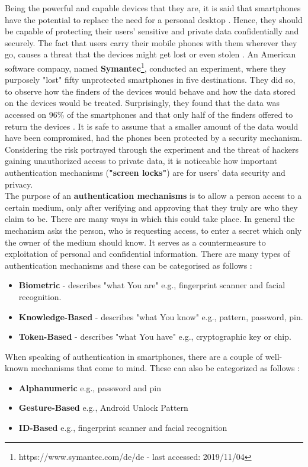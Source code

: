 Being the powerful and capable devices that they are, it is said that smartphones have the potential to replace the need for a personal desktop \cite{Alsaleh}. Hence, they should be capable of protecting their users' sensitive and private data confidentially and securely. The fact that users carry their mobile phones with them wherever they go, causes a threat that the devices might get  lost or even stolen \cite{Egelman:2014:YRL:2660267.2660273}. An American software company, named \textbf{Symantec}\footnote{https://www.symantec.com/de/de - last accessed: 2019/11/04}, conducted an experiment, where they purposely "lost" fifty unprotected smartphones in five destinations. They did so, to observe how the finders of the devices would behave and how the data stored on the devices would be treated. Surprisingly, they found that the data was accessed on 96\% of the smartphones and that only half of the finders offered to return the devices \cite{symantec}. It is safe to assume that a smaller amount of the data would have been compromised, had the phones been protected by a security mechanism. Considering the risk portrayed through the experiment and the threat of hackers gaining unauthorized access to private data, it is noticeable how important authentication mechanisms (\textbf{"screen locks"}) are for users' data security and privacy.\\

The purpose of an \textbf{authentication mechanisms} is to allow a person access to a certain medium, only after verifying and approving that they truly are who they claim to be. There are many ways in which this could take place. In general the mechanism asks the person, who is requesting access, to enter a secret which only the owner of the medium should know. It serves as a countermeasure to exploitation of personal and confidential information. There are many types of authentication mechanisms and these can be categorised as follows \cite{gorman}:  
\begin{itemize}
    \item \textbf{Biometric} - describes "what You are" e.g., fingerprint scanner and facial recognition.
    \item \textbf{Knowledge-Based} - describes "what You know" e.g., pattern, password, pin.
    \item \textbf{Token-Based} - describes "what You have" e.g., cryptographic key or chip.
\end{itemize}


When speaking of authentication in smartphones, there are a couple of well-known mechanisms that come to mind. These can also be categorized as follows \cite{ediss20251,gorman} : 
\begin{itemize}
    \item \textbf{Alphanumeric} e.g., password and pin
    \item \textbf{Gesture-Based} e.g., Android Unlock Pattern
    \item \textbf{ID-Based} e.g., fingerprint scanner and facial recognition 
\end{itemize}

